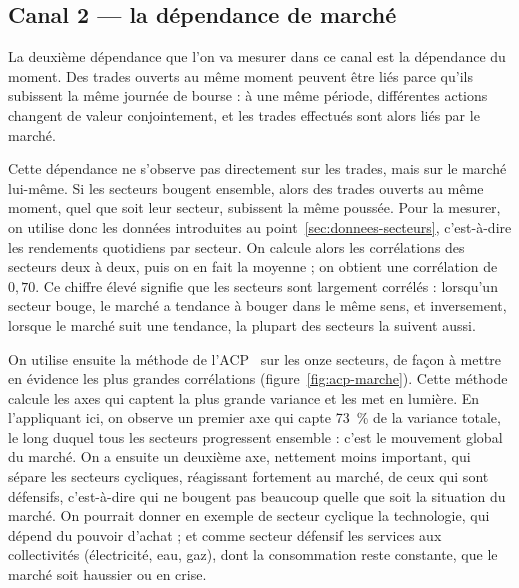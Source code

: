 \subsection{Canal 2 --- la dépendance de marché}
\label{sec:dep-canal2}


La deuxième dépendance que l'on va mesurer dans ce canal est la dépendance
du moment. Des trades ouverts au même moment peuvent être liés parce qu'ils
subissent la même journée de bourse : à une même période, différentes actions
changent de valeur conjointement, et les trades effectués sont alors liés par
le marché.

Cette dépendance ne s'observe pas directement sur les trades, mais sur le
marché lui-même. Si les secteurs bougent ensemble, alors des trades ouverts
au même moment, quel que soit leur secteur, subissent la même poussée. Pour
la mesurer, on utilise donc les données introduites au
point~\ref{sec:donnees-secteurs}, c'est-à-dire les rendements quotidiens par
secteur.
On calcule alors les corrélations des secteurs deux à deux, puis on
en fait la moyenne ; on obtient une corrélation de $0{,}70$.
Ce chiffre élevé signifie que les secteurs sont largement corrélés : lorsqu'un
secteur bouge, le marché a tendance à bouger dans le même sens, et
inversement, lorsque le marché suit une tendance, la plupart des secteurs la
suivent aussi.

On utilise ensuite la méthode de l'ACP~\cite{lebart2006} sur les onze secteurs, de
façon à mettre en évidence les plus grandes corrélations
(figure~\ref{fig:acp-marche}).
Cette méthode calcule les axes qui captent la plus grande
variance et les met en lumière.
En l'appliquant ici, on observe un premier axe qui capte
73~\% de la variance totale, le long duquel tous les secteurs
progressent ensemble : c'est le mouvement global du marché.
On a ensuite un deuxième axe, nettement moins important,
qui sépare les secteurs cycliques, réagissant fortement au
marché, de ceux qui sont défensifs, c'est-à-dire qui ne bougent
pas beaucoup quelle que soit la situation du marché. On pourrait
donner en exemple de secteur cyclique la technologie, qui dépend du pouvoir
d'achat ; et comme secteur défensif les services aux collectivités
(électricité, eau, gaz), dont la consommation reste constante, que le marché
soit haussier ou en crise.


